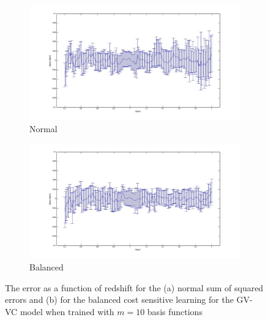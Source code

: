 \documentclass[useAMS,usenatbib,fleqn]{mn2e}
\begin{document}
\begin{figure}
        \centering
        \begin{subfigure}[b]{1\columnwidth}
                \includegraphics[trim = 35px 15px 50px 25px, clip=true,width=\textwidth]{Zspec-Zphot_normal.jpg}
                \caption{Normal}
                \label{fig-normal}
        \end{subfigure}
	
        \begin{subfigure}[b]{1\columnwidth}
                \includegraphics[trim = 35px 15px 50px 25px, clip=true,width=\textwidth]{Zspec-Zphot_balanced.jpg}
                \caption{Balanced}
                \label{fig-balanced}
        \end{subfigure}
        
       \caption{The error as a function of redshift for the (a) normal sum of squared errors and (b) for the balanced cost sensitive learning for the GV-VC model when trained with $m=10$ basis functions}
	\label{fig-normal-balanced}
\end{figure}
\end{document}
